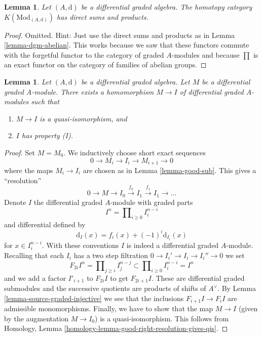 \documentclass{stacks-project}
\theoremstyle{plain}
\newtheorem{lemma}[subsection]{Lemma}
\theoremstyle{definition}
\theoremstyle{remark}
\numberwithin{equation}{subsection}
\begin{document}
\begin{lemma}
\label{lemma-homotopy-direct-sums}
Let $(A, \text{d})$ be a differential graded algebra.
The homotopy category $K(\text{Mod}_{(A, \text{d})})$
has direct sums and products.
\end{lemma}

\begin{proof}
Omitted. Hint: Just use the direct sums and products as in
Lemma \ref{lemma-dgm-abelian}. This works because we saw that
these functors commute with the forgetful functor to the category
of graded $A$-modules and because $\prod$ is an exact functor
on the category of families of abelian groups.
\end{proof}

\begin{lemma}
\label{lemma-right-resolution}
Let $(A, \text{d})$ be a differential graded algebra.
Let $M$ be a differential graded $A$-module. There exists a homomorphism
$M \to I$ of differential graded $A$-modules such that
\begin{enumerate}
\item $M \to I$ is a quasi-isomorphism, and
\item $I$ has property (I).
\end{enumerate}
\end{lemma}

\begin{proof}
Set $M = M_0$. We inductively choose short exact sequences
$$
0 \to M_i \to I_i \to M_{i + 1} \to 0
$$
where the maps $M_i \to I_i$ are chosen as in Lemma \ref{lemma-good-sub}.
This gives a ``resolution''
$$
0 \to M \to I_0 \xrightarrow{f_0} I_1 \xrightarrow{f_1} I_1 \to \ldots
$$
Denote $I$ the differential graded $A$-module with graded parts
$$
I^n = \prod\nolimits_{i \geq 0} I^{n - i}_i
$$
and differential defined by
$$
\text{d}_I(x) = f_i(x) + (-1)^i \text{d}_{I_i}(x)
$$
for $x \in I_i^{n - i}$. With these conventions $I$ is indeed a differential
graded $A$-module. Recalling that each $I_i$ has a two step filtration
$0 \to I_i' \to I_i \to I_i'' \to 0$ we set
$$
F_{2i}I^n = \prod\nolimits_{j \geq i} I^{n - j}_j
\subset
\prod\nolimits_{i \geq 0} I^{n - i}_i = I^n
$$
and we add a factor $I'_{i + 1}$ to $F_{2i}I$ to get $F_{2i + 1}I$.
These are differential graded submodules and the successive quotients
are products of shifts of $A^\vee$. By
Lemma \ref{lemma-source-graded-injective} we see that
the inclusions $F_{i + 1}I \to F_iI$ are admissible monomorphisms.
Finally, we have to show that the map $M \to I$ (given by the
augmentation $M \to I_0$) is a quasi-isomorphism. This follows from
Homology, Lemma \ref{homology-lemma-good-right-resolution-gives-qis}.
\end{proof}
\end{document}
